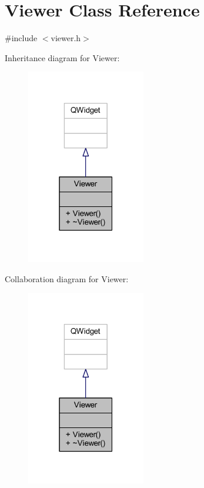 \hypertarget{class_viewer}{}\section{Viewer Class Reference}
\label{class_viewer}


{\ttfamily \#include $<$viewer.\+h$>$}



Inheritance diagram for Viewer\+:
\nopagebreak
\begin{figure}[H]
\begin{center}
\leavevmode
\includegraphics[width=147pt]{class_viewer__inherit__graph}
\end{center}
\end{figure}


Collaboration diagram for Viewer\+:
\nopagebreak
\begin{figure}[H]
\begin{center}
\leavevmode
\includegraphics[width=147pt]{class_viewer__coll__graph}
\end{center}
\end{figure}

